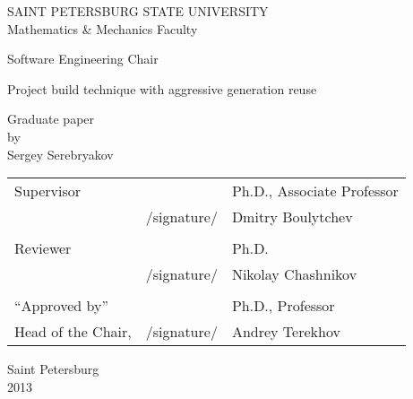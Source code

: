 %
%
\thispagestyle{empty}
\begin{center}
SAINT PETERSBURG STATE UNIVERSITY\\
Mathematics \& Mechanics Faculty\\
\end{center}

\begin{center}
Software Engineering Chair\\
\end{center}
\vspace{2cm}
\begin{center}
    \LARGE{Project build technique with aggressive generation reuse} \\
\end{center}
\vspace{1cm}
\begin{center}
    \normalsize{Graduate paper} \\
	\normalsize{by} \\
    \large{Sergey Serebryakov}
\end{center}
\vspace{3cm}
\noindent
\begin{center}
    \small
    \begin{tabular}{lcl}
        Supervisor & \dotuline{\phantom{место для подписи}} & Ph.D., Associate Professor\\
        & /signature/ & Dmitry Boulytchev\\\\
        Reviewer & \dotuline{\phantom{место для подписи}} & Ph.D.\\
        & /signature/& Nikolay Chashnikov\\\\
        ``Approved by'' & \dotuline{\phantom{место для подписи}} & Ph.D., Professor\\
        Head of the Chair, & /signature/& Andrey Terekhov\\
    \end{tabular}
\end{center}
\vspace{\fill}
\begin{center}
    \small
    Saint Petersburg\\2013
\end{center}

